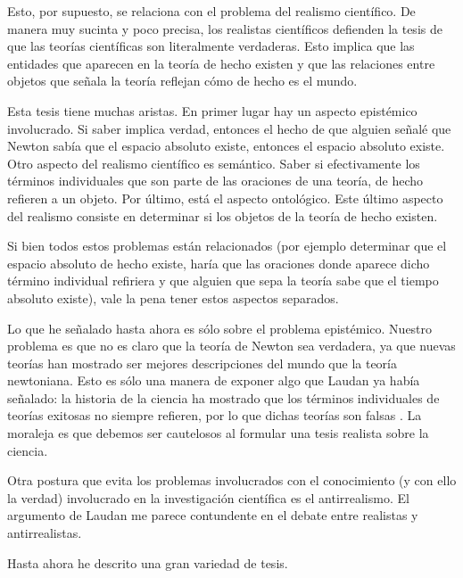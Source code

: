 \documentclass[12pt]{article}
\begin{document}
Esto, por supuesto, se relaciona con el problema del realismo científico. De manera muy sucinta y poco precisa, los realistas científicos defienden la tesis de que las teorías científicas son literalmente verdaderas. Esto implica que las entidades que aparecen en la teoría de hecho existen y que las relaciones entre objetos que señala la teoría reflejan cómo de hecho es el mundo.

Esta tesis tiene muchas aristas. En primer lugar hay un aspecto epistémico involucrado. Si saber implica verdad, entonces el hecho de que alguien señalé que Newton sabía que el espacio absoluto existe, entonces el espacio absoluto existe. Otro aspecto del realismo científico es semántico. Saber si efectivamente los términos individuales que son parte de las oraciones de una teoría, de hecho refieren a un objeto. Por último, está el aspecto ontológico. Este último aspecto del realismo consiste en determinar si los objetos de la teoría de hecho existen.

Si bien todos estos problemas están relacionados (por ejemplo determinar que el espacio absoluto de hecho existe, haría que las oraciones donde aparece dicho término individual refiriera y que alguien que sepa la teoría sabe que el tiempo absoluto existe), vale la pena tener estos aspectos separados. 

Lo que he señalado hasta ahora es sólo sobre el problema epistémico. Nuestro problema es que no es claro que la teoría de Newton sea verdadera, ya que nuevas teorías han mostrado ser mejores descripciones del mundo que la teoría newtoniana. Esto es sólo una manera de exponer algo que Laudan ya había señalado: la historia de la ciencia ha mostrado que los términos individuales de teorías exitosas no siempre refieren, por lo que dichas teorías son falsas \cite{Laudan1981}. La moraleja es que debemos ser cautelosos al formular una tesis realista sobre la ciencia.

Otra postura que evita los problemas involucrados con el conocimiento (y con ello la verdad) involucrado en la investigación científica es el antirrealismo. El argumento de Laudan me parece contundente en el debate entre realistas y antirrealistas. 

Hasta ahora he descrito una gran variedad de tesis. 












\end{document}
